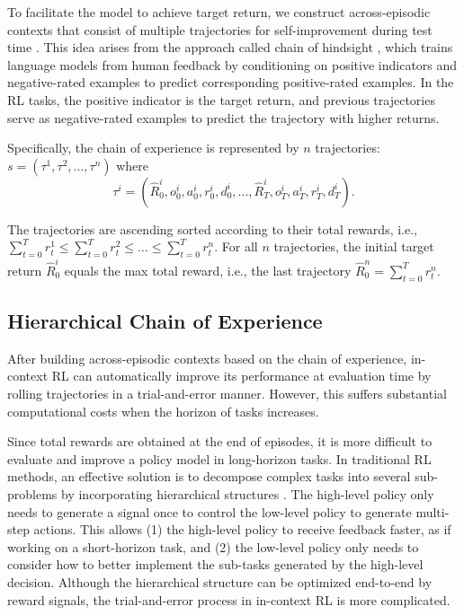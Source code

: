 To facilitate the model to achieve target return, we construct across-episodic contexts that consist of multiple trajectories for self-improvement during test time \cite{1}. This idea arises from the approach called chain of hindsight \cite{24}, which trains language models from human feedback by conditioning on positive indicators and negative-rated examples to predict corresponding positive-rated examples. In the RL tasks, the positive indicator is the target return, and previous trajectories serve as negative-rated examples to predict the trajectory with higher returns.

Specifically, the chain of experience is represented by $n$ trajectories: $s=(\tau^{1},\tau^{2},\dots,\tau^{n})$ where
\begin{equation}
    \tau^{i}= (\hat{R}_0^i,o_0^i,a_0^i,r_0^i,d_0^i,\dots,\hat{R}_T^i,o_T^i,a_T^i,r_T^i,d_T^i).
\label{coe}
\end{equation}

The trajectories are ascending sorted according to their total rewards, i.e., $\sum_{t=0}^T{r_t^1}\leq\sum_{t=0}^T{r_t^2}\leq\dots\leq\sum_{t=0}^T{r_t^n}$. For all $n$ trajectories, the initial target return $\hat{R}_0^i$ equals the max total reward, i.e., the last trajectory $\hat{R}_0^n=\sum_{t=0}^T{r_t^n}$.

\subsection{Hierarchical Chain of Experience}
After building across-episodic contexts based on the chain of experience, in-context RL can automatically improve its performance at evaluation time by rolling trajectories in a trial-and-error manner. However, this suffers substantial computational costs when the horizon of tasks increases.

Since total rewards are obtained at the end of episodes, it is more difficult to evaluate and improve a policy model in long-horizon tasks. In traditional RL methods, an effective solution is to decompose complex tasks into several sub-problems by incorporating hierarchical structures  \cite{10}. The high-level policy only needs to generate a signal once to control the low-level policy to generate multi-step actions. This allows (1) the high-level policy to receive feedback faster, as if working on a short-horizon task, and (2) the low-level policy only needs to consider how to better implement the sub-tasks generated by the high-level decision. Although the hierarchical structure can be optimized end-to-end by reward signals, the trial-and-error process in in-context RL is more complicated.

